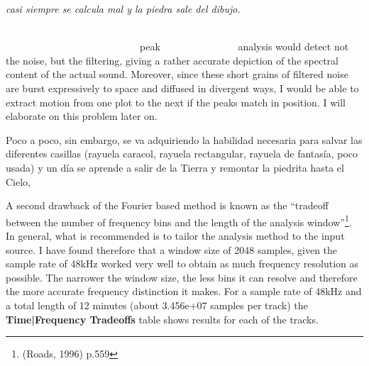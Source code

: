 \documentclass{article}
\begin{document}
\bigskip

\begin{center}
\textit{casi siempre se calcula mal y la piedra sale del dibujo. }

\end{center}

\bigskip

\ \ \ \ \ \ \ \ \ \ \ \ \ \ \ \ \ \ \ \ \ \ \ \ \ \ \ \ \ \ \ \ \ \ \ \ \ \ \ \ \ \ \ \ \ \ \ \ \ \ \ \ \ \ \ \ \ \ \ \ \ \ \ \ \ \ \ \ \ \ \ \ \ \ \ \ \ \ \ \ \ \ \ \ \ \ \ \ \ \ \ \ \ \ \ \ \ \ \ peak \ \ \ \ \ \ \ \ \ \ \ \ \ \ \ analysis would detect not the noise, but the filtering, giving a rather accurate depiction of the spectral content of the actual sound. Moreover, since these short grains of filtered noise are burst expressively to space and diffused in divergent ways, I would be able to extract motion from one plot to the next if the peaks match in position. I will elaborate on this problem later on.


\bigskip

\begin{flushleft}
Poco a poco, sin embargo, se va adquiriendo la habilidad necesaria para salvar las diferentes casillas (rayuela caracol, rayuela rectangular, rayuela de fantas\'{i}a, poco usada) y un d\'{i}a se aprende a salir de la Tierra y remontar la piedrita hasta el Cielo, 

\end{flushleft}

\newpage

\begin{flushright}
A second drawback of the Fourier based method is known as the ``tradeoff between the number of frequency bins and the length of the analysis window''\footnote{(Roads, 1996) p.559}. In general, what is recommended is to tailor the analysis method to the input source. I have found therefore that a window size of 2048 samples, given the sample rate of 48kHz worked very well to obtain as much frequency resolution as possible. The narrower the window size, the less bins it can resolve and therefore the more accurate frequency distinction it makes. For a sample rate of 48kHz and a total length of 12 minutes (about 3.456e+07 samples per track) the \textbf{Time|Frequency Tradeoffs} table shows results for each of the tracks.

\end{flushright}
\end{document}
